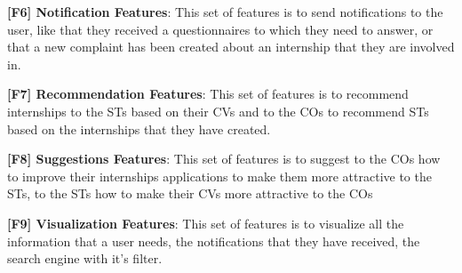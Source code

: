 \par \textbf{[F6] Notification Features}: This set of features is to send notifications to the user, like 
that they received a questionnaires to which they need to answer, or that a new complaint has been created about an internship
that they are involved in.

\par \textbf{[F7] Recommendation Features}: This set of features is to recommend internships to the STs based on their
CVs and to the COs to recommend STs based on the internships that they have created.

\par \textbf{[F8] Suggestions Features}: This set of features is to suggest to the COs how to improve their internships
applications to make them more attractive to the STs, to the STs how to make their CVs more attractive to the COs

\par \textbf{[F9] Visualization Features}: This set of features is to visualize all the information that a user needs,
the notifications that they have received, the search engine with it's filter.